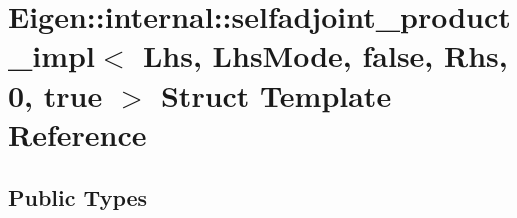 \hypertarget{struct_eigen_1_1internal_1_1selfadjoint__product__impl_3_01_lhs_00_01_lhs_mode_00_01false_00_01_rhs_00_010_00_01true_01_4}{}\section{Eigen\+::internal\+::selfadjoint\+\_\+product\+\_\+impl$<$ Lhs, Lhs\+Mode, false, Rhs, 0, true $>$ Struct Template Reference}
\label{struct_eigen_1_1internal_1_1selfadjoint__product__impl_3_01_lhs_00_01_lhs_mode_00_01false_00_01_rhs_00_010_00_01true_01_4}
\subsection*{Public Types}
